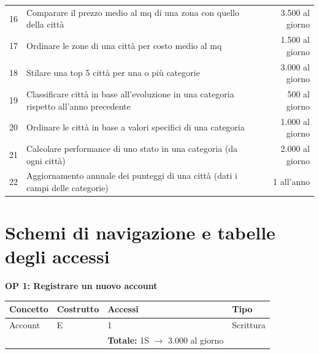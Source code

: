 \documentclass[a4paper,12pt]{report}
\begin{document}
\begin{table}[H]
\begin{adjustbox}{width=1.45\textwidth,center}
\begin{tabular}{clr}
             16 & Comparare il prezzo medio al mq di una zona con quello della città & 3.500 al giorno \\ 
             17 & Ordinare le zone di una città per costo medio al mq & 1.500 al giorno \\
             18 & Stilare una top 5 città per una o più categorie & 3.000 al giorno \\
             19 & Classificare città in base all'evoluzione in una categoria rispetto all'anno precedente & 500 al giorno \\ 
             20 & Ordinare le città in base a valori specifici di una categoria & 1.000 al giorno \\ 
             21 & Calcolare performance di uno stato in una categoria (da ogni città) & 2.000 al giorno \\ 
             22 & Aggiornamento annuale dei punteggi di una città (dati i campi delle categorie) & 1 all'anno \\ [1ex]
            \end{tabular}
            \end{adjustbox}
            \end{table}
        	
    	\section{Schemi di navigazione e tabelle degli accessi}	

        \textbf{OP 1: Registrare un nuovo account}
        	\begin{table}[H]
            \centering
             \begin{tabular}{llll}
             \rowcolor{yellow!20}\textbf{Concetto} & \textbf{Costrutto} & \textbf{Accessi} & \textbf{Tipo} \\ [0.5ex] 
             \hline
             Account & E & 1 & Scrittura \\ 
             \hline
             \rowcolor{yellow!20}\rowcolor{yellow!20} &   & \textbf{Totale:} 1S $\rightarrow$ 3.000 al giorno &  \\ [1ex] 
             \end{tabular}
            \end{table}
\end{document}
